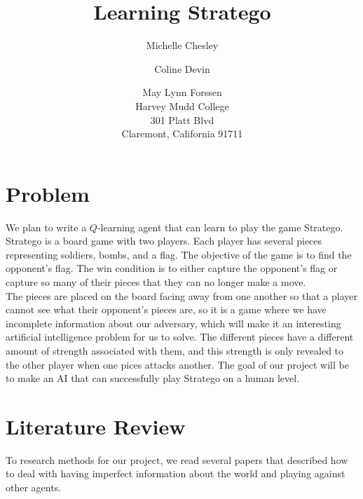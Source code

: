 \documentclass[letterpaper]{article}
\begin{document}
\title {Learning Stratego}
\author{Michelle Chesley \and Coline Devin \and May Lynn Forssen\\
Harvey Mudd College\\
301 Platt Blvd\\
Claremont, California 91711\\
}  
%
\maketitle

\section{Problem }
We plan to write a $Q$-learning agent that can learn to play the game Stratego. Stratego is a board game with two players. Each player has several pieces representing soldiers, bombs, and a flag. The objective of the game is to find the opponent's flag. The win condition is to either capture the opponent's flag or capture so many of their pieces that they can no longer make a move. \\

The pieces are placed on the board facing away from one another so that a player cannot see what their opponent's pieces are, so it is a game where we have incomplete information about our adversary, which will make it an interesting artificial intelligence problem for us to solve. The different pieces have a different amount of strength associated with them, and this strength is only revealed to the other player when one pices attacks another. The goal of our project will be to make an AI that can successfully play Stratego on a human level.\\

\section{Literature Review}
To research methods for our project, we read several papers that described how to deal with having imperfect information about the world and playing against other agents.\\
\end{document}
